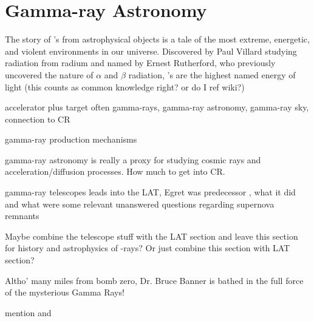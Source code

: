 \chapter{Gamma-ray Astronomy}
\label{chap:gamAstr}

The story of \gam 's from astrophysical objects is a tale of the most extreme, energetic, and violent environments in our universe. Discovered by Paul Villard studying radiation from radium and named by Ernest Rutherford, who previously uncovered the nature of $\alpha$ and $\beta$ radiation, \gam's are the highest named energy of light (this counts as common knowledge right? or do I ref wiki?)

accelerator plus target often {}
gamma-rays, gamma-ray astronomy, gamma-ray sky, connection to CR

gamma-ray production mechanisms

gamma-ray astronomy is really a proxy for studying cosmic rays and acceleration/diffusion processes. How much to get into CR. 

gamma-ray telescopes leads into the LAT, Egret was  predecessor , what it did and what were some relevant unanswered questions regarding supernova remnants 
    
Maybe combine the telescope stuff  with the LAT section and leave this section for history and astrophysics of \g-rays? Or just combine this section with  LAT section?

Altho' many miles from bomb zero, Dr. Bruce Banner is bathed in the full force of the mysterious Gamma Rays!

mention \cgro and \egret